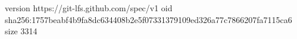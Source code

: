 version https://git-lfs.github.com/spec/v1
oid sha256:1757beabf4b9fa8dc634408b2e5f07331379109ed326a77c7866207fa7115ca6
size 3314
